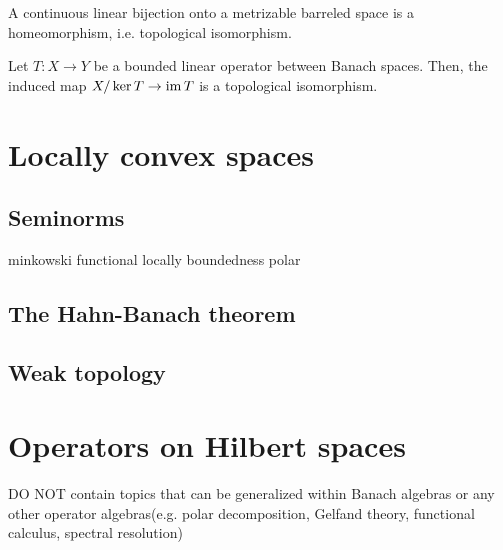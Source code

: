 \documentclass{../crs}
\begin{document}
\begin{cor}
A continuous linear bijection onto a metrizable barreled space is a homeomorphism, i.e. topological isomorphism.
\end{cor}
\begin{cor}
Let $T:X\to Y$ be a bounded linear operator between Banach spaces.
Then, the induced map $X/\ker T\to\im T$ is a topological isomorphism.
\end{cor}















\chapter{Locally convex spaces}
\section{Seminorms}
minkowski functional
locally boundedness
polar

\section{The Hahn-Banach theorem}

\section{Weak topology}



















\chapter{Operators on Hilbert spaces}
DO NOT contain topics that can be generalized within Banach algebras or any other operator algebras(e.g. polar decomposition, Gelfand theory, functional calculus, spectral resolution)
\end{document}
